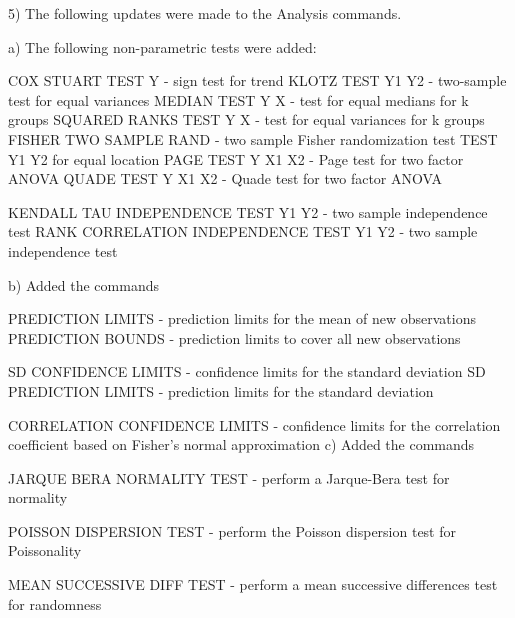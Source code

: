 { 5) The following updates were made to the Analysis commands.

    a) The following non-parametric tests were added:

           COX STUART TEST Y         - sign test for trend
           KLOTZ TEST Y1 Y2          - two-sample test for equal variances
           MEDIAN TEST Y X           - test for equal medians for k groups
           SQUARED RANKS TEST Y X    - test for equal variances for k groups
           FISHER TWO SAMPLE RAND    - two sample Fisher randomization test
                  TEST Y1 Y2           for equal location
           PAGE TEST Y X1 X2         - Page test for two factor ANOVA
           QUADE TEST Y X1 X2        - Quade test for two factor ANOVA

           KENDALL TAU INDEPENDENCE TEST Y1 Y2       - two sample
                                                       independence test
           RANK CORRELATION INDEPENDENCE TEST Y1 Y2  - two sample
                                                       independence test

    b) Added the commands

           PREDICTION LIMITS               - prediction limits for the
                                             mean of new observations
           PREDICTION BOUNDS               - prediction limits to cover
                                             all new observations

           SD CONFIDENCE LIMITS            - confidence limits for the
                                             standard deviation
           SD PREDICTION LIMITS            - prediction limits for the
                                             standard deviation

           CORRELATION CONFIDENCE LIMITS   - confidence limits for the
                                             correlation coefficient based on
                                             Fisher's normal approximation
    c) Added the commands

           JARQUE BERA NORMALITY TEST  - perform a Jarque-Bera test for
                                         normality

           POISSON DISPERSION TEST     - perform the Poisson dispersion
                                         test for Poissonality

           MEAN SUCCESSIVE DIFF TEST   - perform a mean successive
                                         differences test for randomness

}
